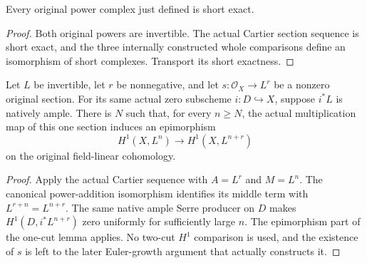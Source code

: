 \begin{lemma}
\label{lem:seshadri-same-section-original-power-short-exact}
\leanok
{}
Every original power complex just defined is short exact.
\end{lemma}
\begin{proof}
Both original powers are invertible. The actual Cartier section sequence
is short exact, and the three internally constructed whole comparisons
define an isomorphism of short complexes. Transport its short exactness.
\end{proof}

\begin{lemma}
\label{lem:seshadri-single-cut-eventual-hone-epi}
\leanok
Let $L$ be invertible, let $r$ be nonnegative, and let $s:\mathcal O_X\to L^r$ be a
nonzero original section. For its same actual zero subscheme
$i:D\hookrightarrow X$, suppose $i^*L$ is natively ample. There is
$N$ such that, for every $n\geq N$, the actual multiplication map of
this one section induces an epimorphism
\[
H^1(X,L^n)\longrightarrow H^1(X,L^{n+r})
\]
on the original field-linear cohomology.
\end{lemma}
\begin{proof}
Apply the actual Cartier sequence with $A=L^r$ and $M=L^n$.
The canonical power-addition isomorphism identifies its middle term
with $L^{r+n}=L^{n+r}$. The same native ample Serre producer on $D$
makes $H^1(D,i^*L^{n+r})$ zero uniformly for sufficiently large $n$.
The epimorphism part of the one-cut lemma applies. No two-cut $H^1$
comparison is used, and the existence of $s$ is left to the later
Euler-growth argument that actually constructs it.
\end{proof}

